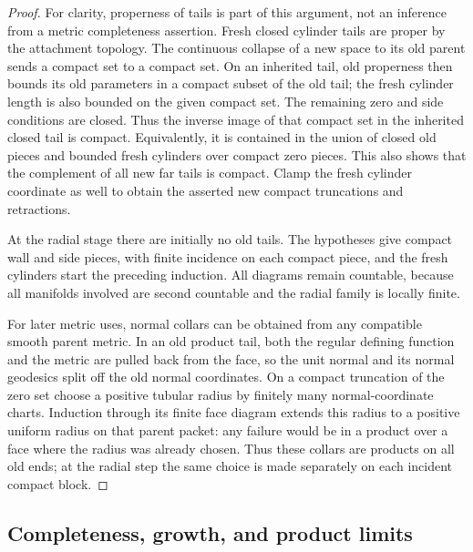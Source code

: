 \documentclass[11pt]{article}
\numberwithin{equation}{section}
\theoremstyle{definition}
\theoremstyle{remark}
\begin{document}
\begin{proof}
For clarity, properness of tails is part of this argument, not an
inference from a metric completeness assertion.  Fresh closed cylinder
tails are proper by the attachment topology.  The continuous collapse
of a new space to its old parent sends a compact set to a compact set.
On an inherited tail, old properness then bounds its old parameters
in a compact subset of the old tail; the fresh cylinder length is
also bounded on the given compact set.  The remaining zero and side
conditions are closed.  Thus the inverse image of that compact set
in the inherited closed tail is compact.  Equivalently, it is contained
in the union of closed old pieces and bounded fresh cylinders over
compact zero pieces.  This also shows that the complement of all new
far tails is compact.  Clamp the fresh cylinder coordinate as well
to obtain the asserted new compact truncations and retractions.

At the radial stage there are initially no old tails.  The hypotheses
give compact wall and side pieces, with finite incidence on each
compact piece, and the fresh cylinders start the preceding induction.
All diagrams remain countable, because all manifolds involved are
second countable and the radial family is locally finite.

For later metric uses, normal collars can be obtained from any
compatible smooth parent metric.  In an old product tail, both the
regular defining function and the metric are pulled back from the
face, so the unit normal and its normal geodesics split off the old
normal coordinates.  On a compact truncation of the zero set choose
a positive tubular radius by finitely many normal-coordinate charts.
Induction through its finite face diagram extends this radius to a
positive uniform radius on that parent packet: any failure would
be in a product over a face where the radius was already chosen.
Thus these collars are products on all old ends; at the radial step
the same choice is made separately on each incident compact block.
\end{proof}

\subsection{Completeness, growth, and product limits}
\end{document}
